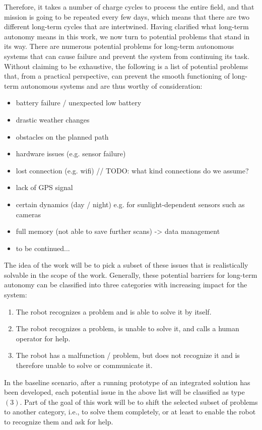 \documentclass[german, master, expose, latin1]{base/thesis_KBS}
\begin{document}
Therefore, it takes a number of charge cycles to process the entire field, and that mission is going to be repeated every few days,
which means that there are two different long-term cycles that are intertwined.\newline
Having clarified what long-term autonomy means in this work, we now turn to potential problems that stand in its way.
There are numerous potential problems for long-term autonomous systems that can cause failure and prevent the system from continuing its task.
Without claiming to be exhaustive, the following is a list of potential problems that, from a practical perspective, can prevent the smooth functioning
of long-term autonomous systems and are thus worthy of consideration:
\begin{itemize}
    \item battery failure / unexpected low battery
    \item drastic weather changes
    \item obstacles on the planned path
    \item hardware issues (e.g. sensor failure)
    \item lost connection (e.g. wifi) // TODO: what kind connections do we assume?
    \item lack of GPS signal
    \item certain dynamics (day / night) e.g. for sunlight-dependent sensors such as cameras
    \item full memory (not able to save further scans) -> data management
    \item to be continued...
\end{itemize}

The idea of the work will be to pick a subset of these issues that is realistically solvable in the scope of the work.
Generally, these potential barriers for long-term autonomy can be classified into three categories with increasing impact for the system:
\begin{enumerate}
    \item The robot recognizes a problem and is able to solve it by itself.
    \item The robot recognizes a problem, is unable to solve it, and calls a human operator for help.
    \item The robot has a malfunction / problem, but does not recognize it and is therefore unable to solve or communicate it.
\end{enumerate}

In the baseline scenario, after a running prototype of an integrated solution has been developed, each potential issue in the above list will be classified as type $(3)$.
Part of the goal of this work will be to shift the selected subset of problems to another category, i.e., to solve them completely, 
or at least to enable the robot to recognize them and ask for help.
\end{document}
